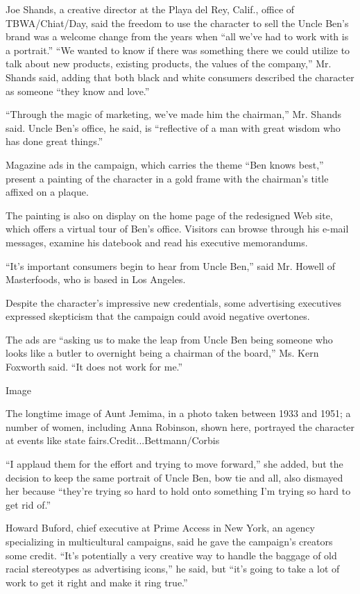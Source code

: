 Joe Shands, a creative director at the Playa del Rey, Calif., office of
TBWA/Chiat/Day, said the freedom to use the character to sell the Uncle
Ben's brand was a welcome change from the years when ``all we've had to
work with is a portrait.'' ``We wanted to know if there was something
there we could utilize to talk about new products, existing products,
the values of the company,'' Mr. Shands said, adding that both black and
white consumers described the character as someone ``they know and
love.''

``Through the magic of marketing, we've made him the chairman,'' Mr.
Shands said. Uncle Ben's office, he said, is ``reflective of a man with
great wisdom who has done great things.''

Magazine ads in the campaign, which carries the theme ``Ben knows
best,'' present a painting of the character in a gold frame with the
chairman's title affixed on a plaque.

The painting is also on display on the home page of the redesigned Web
site, which offers a virtual tour of Ben's office. Visitors can browse
through his e-mail messages, examine his datebook and read his executive
memorandums.

``It's important consumers begin to hear from Uncle Ben,'' said Mr.
Howell of Masterfoods, who is based in Los Angeles.

Despite the character's impressive new credentials, some advertising
executives expressed skepticism that the campaign could avoid negative
overtones.

The ads are ``asking us to make the leap from Uncle Ben being someone
who looks like a butler to overnight being a chairman of the board,''
Ms. Kern Foxworth said. ``It does not work for me.''

Image

The longtime image of Aunt Jemima, in a photo taken between 1933 and
1951; a number of women, including Anna Robinson, shown here, portrayed
the character at events like state fairs.Credit...Bettmann/Corbis

``I applaud them for the effort and trying to move forward,'' she added,
but the decision to keep the same portrait of Uncle Ben, bow tie and
all, also dismayed her because ``they're trying so hard to hold onto
something I'm trying so hard to get rid of.''

Howard Buford, chief executive at Prime Access in New York, an agency
specializing in multicultural campaigns, said he gave the campaign's
creators some credit. ``It's potentially a very creative way to handle
the baggage of old racial stereotypes as advertising icons,'' he said,
but ``it's going to take a lot of work to get it right and make it ring
true.''

